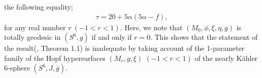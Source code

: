 \documentclass[12pt]{article}
\numberwithin{equation}{section}
\begin{document}
the following equality;
\begin{equation}\label{421}
\begin{split}
\tau = 20+5\alpha(5\alpha-f),
\end{split}
\end{equation}
for any real number $r~(-1<r<1)$.
Here, we note that $(M_{0},\phi, \xi, \eta, g)$ is totally geodesic in $(S^6, g)$
if and only if $r=0.$ This shows that
the statement of the result(\cite{DA}, Theorem 1.1) is inadequate
by taking account of the 1-parameter family of the Hopf
hypersurfaces $(M_r, g, \xi)$ $(-1<r<1)$ of the nearly {K\"ahler}
6-sphere $(S^6, J, \bar{g})$.
\end{document}
